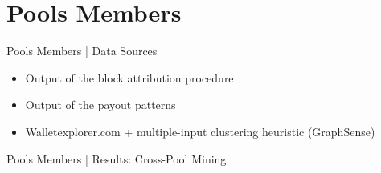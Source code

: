 \documentclass[10pt]{beamer}
\begin{document}
\section{Pools Members} 
\begin{frame}[fragile]{Pools Members | Data Sources}
    \begin{itemize}
        \item Output of the block attribution procedure
        \item Output of the payout patterns
        \item Walletexplorer.com + multiple-input clustering heuristic (GraphSense)
    \end{itemize}
\end{frame}

\begin{frame}[fragile]{Pools Members | Results: Cross-Pool Mining}
    \setlength{\tabcolsep}{3pt}
    \begin{table}
        \caption{Cross-pool mining between block 510,000 and 514,032 ($\sim$ 4 weeks), including how much BTC from each pool has been received by those common addresses.} \label{table:crosspool_addresses}
    \end{table}
\end{frame}
\end{document}
